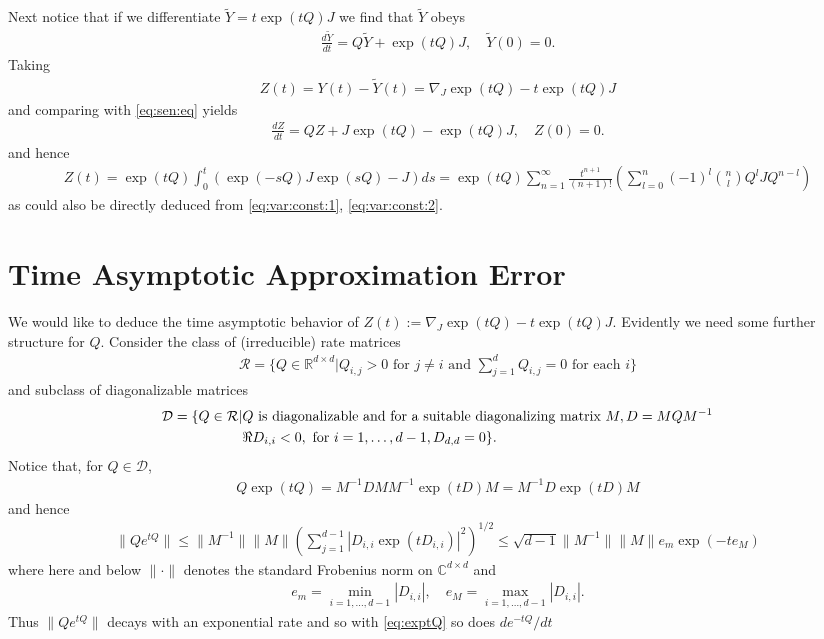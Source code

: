 \documentclass[twoside]{article}
\numberwithin{equation}{section}
\newcommand{\RR}{\mathbb{R}}
\newcommand{\CC}{\mathbb{C}}
\begin{document}
Next notice that if we differentiate $\tilde{Y} =  t  \exp(t Q) J$ we find that $\tilde{Y}$ obeys
\begin{align}
	\frac{d \tilde{Y}}{dt} = Q \tilde{Y} +  \exp(t Q) J, \quad \tilde{Y}(0) = 0.
\end{align}
Taking 
\begin{align}
Z(t) = Y(t) - \tilde{Y}(t) = \nabla_J \exp(t Q) - t  \exp(t Q) J
\label{eq:true:diff}
\end{align}
and comparing with \eqref{eq:sen:eq} yields
\begin{align}
\label{eq:Z:dym}
	\frac{dZ}{dt} = Q Z + J \exp(t Q) -  \exp(t Q) J, \quad Z(0) = 0.
\end{align}
and hence
\begin{align}
	\label{eq:ass:procs}
	Z(t) = \exp(t Q) \int_0^t (\exp(-sQ) J \exp(s Q) - J) ds
	=  \exp(t Q) \sum_{n = 1}^\infty \frac{t^{n+1}}{(n+1)!}  
	\left( \sum_{l = 0}^n (-1)^l \binom{n}{l} Q^l J Q^{n -l}\right)
\end{align}
as could also be directly deduced from \eqref{eq:var:const:1}, \eqref{eq:var:const:2}.


\section{Time Asymptotic Approximation Error}

We would like to deduce the time asymptotic behavior of $Z(t) := \nabla_J \exp(t Q) - t  \exp(t Q) J$.    Evidently we need some further
structure for $Q$.   Consider the class of (irreducible) rate matrices 
\begin{align}
	\mathcal{R} = \{ Q \in \RR^{d\times d} | Q_{i,j} > 0 \text{ for } j \not= i \text{ and } \sum_{j =1}^d Q_{i,j} = 0
	\text{ for each } i\}
\end{align}
and subclass of diagonalizable matrices 
\begin{align}
	\mathcal{D}  =  \{ Q \in \mathcal{R} |& Q \text{ is diagonalizable and for a suitable diagonalizing matrix } M, D = M Q M^{-1} \notag\\
		& \Re D_{i,i} < 0, \text{ for } i = 1, \ldots, d-1, D_{d,d} = 0\}.
		\label{eq:Q:spc}
\end{align}
Notice that, for $Q \in \mathcal{D}$, 
\begin{align*}
Q \exp(t Q) = M^{-1} D M M^{-1} \exp(t D) M = M^{-1} D \exp(t D) M
\end{align*}
 and hence
\begin{align}
	\| Q e^{tQ} \| \leq  \| M^{-1}\| \|M\| \left( \sum_{j =1}^{d-1} | D_{i,i} \exp( t D_{i,i}) |^2 \right)^{1/2}
	\leq  \sqrt{d-1}\| M^{-1}\| \|M\| e_m \exp(-t e_M)
	\label{eq:decay:est:1}
\end{align}
where here and below $\| \cdot \|$ denotes the standard Frobenius norm on $\CC^{d \times d}$
and 
\begin{align}
	e_m = \min_{i = 1, \ldots, d-1} |D_{i,i}|, \quad e_M = \max_{i = 1, \ldots, d-1} |D_{i,i}|.
	\label{eq:max:min:D}
\end{align}
Thus $\| Q e^{tQ} \|$ decays with an exponential rate and so with \eqref{eq:exptQ} so does
$de^{-tQ} /dt$
\end{document}
